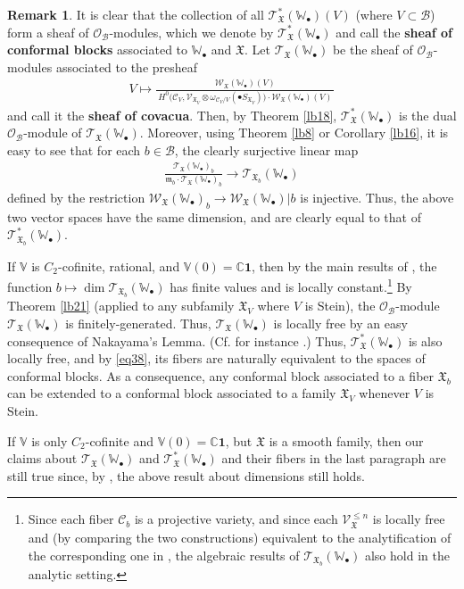 \documentclass[12pt,a4paper,notitlepage]{article}
\theoremstyle{definition}
\newtheorem{rem}[df]{Remark}
\theoremstyle{plain}
\newcommand{\fk}{\mathfrak}
\newcommand{\mc}{\mathcal}
\newcommand{\id}{\mathbf{1}}
\newcommand{\scr}{\mathscr}
\newcommand{\blt}{\bullet}
\newcommand{\Vbb}{\mathbb V}
\newcommand{\Wbb}{\mathbb W}
\newcommand{\Cbb}{\mathbb C}
\numberwithin{equation}{section}
\begin{document}
\begin{rem}\label{lb22}
It is clear that the collection of all $\scr T_{\fk X}^*(\Wbb_\blt)(V)$ (where $V\subset\mc B$) form a sheaf of $\scr O_{\mc B}$-modules, which we denote by $\scr T_{\fk X}^*(\Wbb_\blt)$ \index{T@$\scr T_{\fk X}^*(\Wbb_\blt),\scr T_{\fk X}^*(\Wbb_\blt)(\mc B)$} and call the \textbf{sheaf of conformal blocks} associated to $\Wbb_\blt$ and $\fk X$. Let $\scr T_{\fk X}(\Wbb_\blt)$ be the sheaf of $\scr O_{\mc B}$-modules associated to the presheaf
\begin{align*}
V\mapsto \frac{\scr W_{\fk X}(\Wbb_\blt)(V)} {~H^0\big(\mc C_V,\scr V_{\fk X_V}\otimes\omega_{\mc C_V/V}(\blt S_{\fk X_V})\big)\cdot \scr W_{\fk X}(\Wbb_\blt)(V)~}
\end{align*}
and call it the \textbf{sheaf of covacua}. Then, by Theorem \ref{lb18}, $\scr T_{\fk X}^*(\Wbb_\blt)$ is the dual $\scr O_{\mc B}$-module of $\scr T_{\fk X}(\Wbb_\blt)$. Moreover, using Theorem \ref{lb8} or Corollary \ref{lb16}, it is easy to see that for each $b\in\mc B$, the clearly surjective linear map
\begin{align}
\frac{\scr T_{\fk X}(\Wbb_\blt)_b}{\fk m_b\cdot \scr T_{\fk X}(\Wbb_\blt)_b}\rightarrow\scr T_{\fk X_b}(\Wbb_\blt)\label{eq38}
\end{align}
defined by the restriction $\scr W_{\fk X}(\Wbb_\blt)_b\rightarrow \scr W_{\fk X}(\Wbb_\blt)|b$ is injective. Thus, the above two vector spaces have the same dimension, and are clearly equal to that of $\scr T_{\fk X_b}^*(\Wbb_\blt)$.

If $\Vbb$ is $C_2$-cofinite, rational, and $\Vbb(0)=\Cbb\id$, then by the main results of \cite{DGT19b}, the function $b\mapsto \dim\scr T_{\fk X_b}(\Wbb_\blt)$ has finite values and is locally constant.\footnote{Since each  fiber $\mc C_b$ is a projective variety, and since each $\scr V_{\fk X}^{\leq n}$ is locally free and (by comparing the two constructions) equivalent to the analytification of the corresponding one in \cite{DGT19a,DGT19b},  the algebraic results of $\scr T_{\fk X_b}(\Wbb_\blt)$ also hold in the analytic setting.} By Theorem \ref{lb21} (applied to any subfamily $\fk X_V$ where $V$ is Stein), the $\scr O_{\mc B}$-module $\scr T_{\fk X}(\Wbb_\blt)$ is finitely-generated. Thus, $\scr T_{\fk X}(\Wbb_\blt)$ is locally free by an easy consequence of Nakayama's Lemma. (Cf. for instance \cite[Lemma III.1.6]{BS76}.) Thus, $\scr T_{\fk X}^*(\Wbb_\blt)$ is also locally free, and by \eqref{eq38}, its fibers are naturally equivalent to the spaces of conformal blocks. As a consequence, any conformal block associated to a fiber $\fk X_b$ can be extended to a conformal block associated to a family $\fk X_V$ whenever $V$ is Stein.



If $\Vbb$ is only $C_2$-cofinite and $\Vbb(0)=\Cbb\id$, but $\fk X$ is a smooth family, then our claims about $\scr T_{\fk X}(\Wbb_\blt)$ and $\scr T_{\fk X}^*(\Wbb_\blt)$ and their fibers in the last paragraph are still true since,  by \cite{DGT19b}, the above result about dimensions still holds. 
\end{rem}
\end{document}
